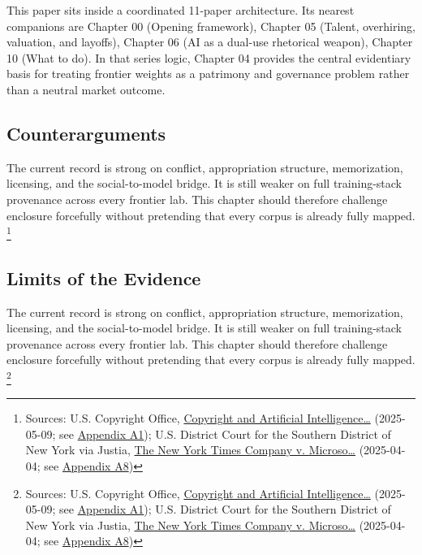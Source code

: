 \documentclass[
  american,
  11pt,
  letterpaper,
]{article}
\begin{document}
This paper sits inside a coordinated 11-paper architecture. Its nearest
companions are Chapter 00 (Opening framework), Chapter 05 (Talent,
overhiring, valuation, and layoffs), Chapter 06 (AI as a dual-use
rhetorical weapon), Chapter 10 (What to do). In that series logic,
Chapter 04 provides the central evidentiary basis for treating frontier
weights as a patrimony and governance problem rather than a neutral
market outcome.

\subsection{Counterarguments}\label{counterarguments}

The current record is strong on conflict, appropriation structure,
memorization, licensing, and the social-to-model bridge. It is still
weaker on full training-stack provenance across every frontier lab. This
chapter should therefore challenge enclosure forcefully without
pretending that every corpus is already fully mapped. \footnote{Sources:
  U.S. Copyright Office,
  \href{https://copyright.gov/ai/Copyright-and-Artificial-Intelligence-Part-3-Generative-AI-Training-Report-Pre-Publication-Version.pdf}{Copyright
  and Artificial Intelligence\ldots{}} (2025-05-09; see
  \hyperref[appendix-a1-copyright-and-artificial-intelligence-part-3-generative-ai-training-pre-publication-version]{Appendix
  A1}); U.S. District Court for the Southern District of New York via
  Justia,
  \href{https://cases.justia.com/federal/district-courts/new-york/nysdce/1\%3A2023cv11195/612697/514/0.pdf?ts=1743868265}{The
  New York Times Company v. Microso\ldots{}} (2025-04-04; see
  \hyperref[appendix-a8-the-new-york-times-company-v-microsoft-corporation-et-al-opinion-on-motions-to-dismiss]{Appendix
  A8})}

\subsection{Limits of the Evidence}\label{limits-of-the-evidence}

The current record is strong on conflict, appropriation structure,
memorization, licensing, and the social-to-model bridge. It is still
weaker on full training-stack provenance across every frontier lab. This
chapter should therefore challenge enclosure forcefully without
pretending that every corpus is already fully mapped. \footnote{Sources:
  U.S. Copyright Office,
  \href{https://copyright.gov/ai/Copyright-and-Artificial-Intelligence-Part-3-Generative-AI-Training-Report-Pre-Publication-Version.pdf}{Copyright
  and Artificial Intelligence\ldots{}} (2025-05-09; see
  \hyperref[appendix-a1-copyright-and-artificial-intelligence-part-3-generative-ai-training-pre-publication-version]{Appendix
  A1}); U.S. District Court for the Southern District of New York via
  Justia,
  \href{https://cases.justia.com/federal/district-courts/new-york/nysdce/1\%3A2023cv11195/612697/514/0.pdf?ts=1743868265}{The
  New York Times Company v. Microso\ldots{}} (2025-04-04; see
  \hyperref[appendix-a8-the-new-york-times-company-v-microsoft-corporation-et-al-opinion-on-motions-to-dismiss]{Appendix
  A8})}
\end{document}
